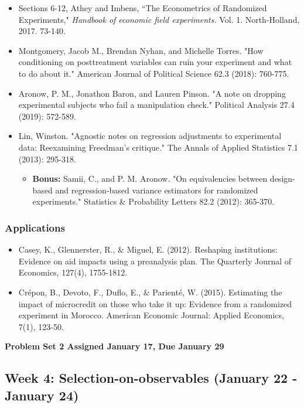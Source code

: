 \documentclass[11pt, article, oneside]{memoir}
\theoremstyle{Assumption}
\begin{document}
\begin{itemize}
\item Sections 6-12, Athey and Imbens, ``The Econometrics of Randomized Experiments,"  \textit{Handbook of economic field experiments.} Vol. 1. North-Holland, 2017. 73-140. 
\item Montgomery, Jacob M., Brendan Nyhan, and Michelle Torres. "How conditioning on posttreatment variables can ruin your experiment and what to do about it." American Journal of Political Science 62.3 (2018): 760-775.
\item Aronow, P. M., Jonathon Baron, and Lauren Pinson. "A note on dropping experimental subjects who fail a manipulation check." Political Analysis 27.4 (2019): 572-589.
\item Lin, Winston. "Agnostic notes on regression adjustments to experimental data: Reexamining Freedman’s critique." The Annals of Applied Statistics 7.1 (2013): 295-318.
\begin{itemize}
\item \textbf{Bonus:} Samii, C., and P. M. Aronow. "On equivalencies between design-based and regression-based variance estimators for randomized experiments." Statistics \& Probability Letters 82.2 (2012): 365-370.
\end{itemize}

\end{itemize}

\subsubsection*{Applications}

\begin{itemize}
\item Casey, K., Glennerster, R., \& Miguel, E. (2012). Reshaping institutions: Evidence on aid impacts using a preanalysis plan. The Quarterly Journal of Economics, 127(4), 1755-1812.
\item Crépon, B., Devoto, F., Duflo, E., \& Parienté, W. (2015). Estimating the impact of microcredit on those who take it up: Evidence from a randomized experiment in Morocco. American Economic Journal: Applied Economics, 7(1), 123-50.
\end{itemize}


\textbf{Problem Set 2 Assigned January 17, Due January 29}

\subsection{Week 4: Selection-on-observables (January 22 - January 24)}
\end{document}

